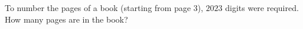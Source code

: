 To number the pages of a book (starting from page $3$), $2023$ digits were required. How many pages are in the book?
